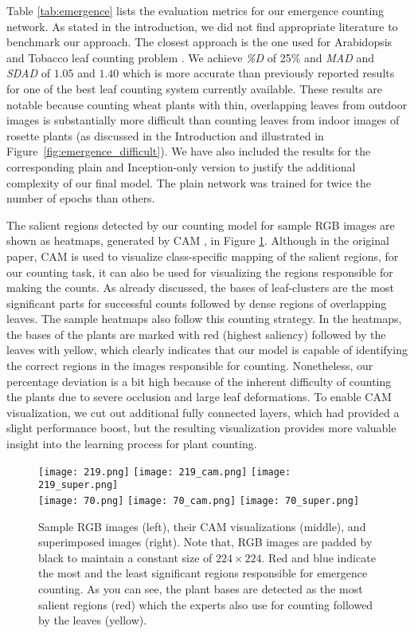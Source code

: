 \documentclass[10pt,twocolumn,letterpaper]{article}
\begin{document}
Table \ref{tab:emergence} lists the evaluation metrics for our emergence counting network. As stated in the introduction, we did not find appropriate literature to benchmark our approach. The closest approach is the one used for Arabidopsis and Tobacco leaf counting problem \cite{aich-cvppp2017}. %
We achieve \textit{\%D} of 25\% and \textit{MAD} and \textit{SDAD} of $1.05$ and $1.40$ which is more accurate than previously reported results for one of the best leaf counting system currently available. These results are notable because counting wheat plants with thin, overlapping leaves from outdoor images is substantially more difficult than counting leaves from indoor images of rosette plants (as discussed in the Introduction and illustrated in Figure~\ref{fig:emergence_difficult}). We have also included the results for the corresponding plain and Inception-only version to justify the additional complexity of our final model. The plain network was trained for twice the number of epochs than others.

The salient regions detected by our counting model for sample RGB images are shown as heatmaps, generated by CAM \cite{cam-mit}, in Figure \ref{fig:cam}. Although in the original paper, CAM is used to visualize class-specific mapping of the salient regions, for our counting task, it can also be used for visualizing the regions responsible for making the counts. As already discussed, the bases of leaf-clusters are the most significant parts for successful counts followed by dense regions of overlapping leaves. The sample heatmaps also follow this counting strategy. In the heatmaps, the bases of the plants are marked with red (highest saliency) followed by the leaves with yellow, which clearly indicates that our model is capable of identifying the correct regions in the images responsible for counting. Nonetheless, our percentage deviation is a bit high because of the inherent difficulty of counting the plants due to severe occlusion and large leaf deformations.
To enable CAM visualization, we cut out additional fully connected layers, which had provided a slight performance boost, but the resulting visualization provides more valuable insight into the learning process for plant counting.


\begin{figure}[]
	\centering
	\texttt{[image: 219.png]}
	\texttt{[image: 219\_cam.png]}
	\texttt{[image: 219\_super.png]} \\
	\texttt{[image: 70.png]}
	\texttt{[image: 70\_cam.png]}
	\texttt{[image: 70\_super.png]}
    \caption{Sample RGB images (left), their CAM \cite{cam-mit} visualizations (middle), and superimposed images (right). Note that, RGB images are padded by black to maintain a constant size of $224\times 224$. Red and blue indicate the most and the least significant regions responsible for emergence counting. As you can see, the plant bases are detected as the most salient regions (red) which the experts also use for counting followed by the leaves (yellow).}
    \label{fig:cam}
\end{figure}
\end{document}
